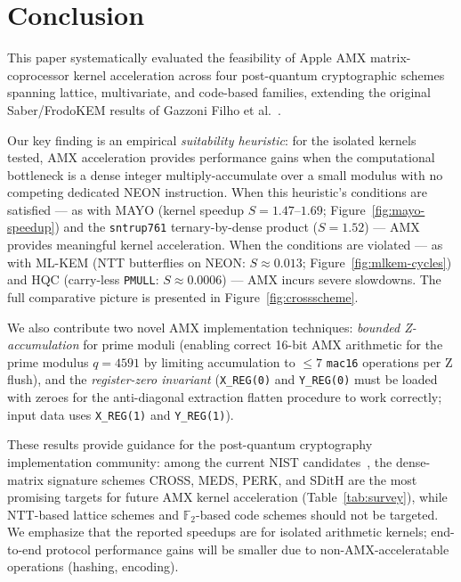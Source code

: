 \documentclass[utf8]{FrontiersinHarvard}
\begin{document}
\section{Conclusion}
\label{sec:conclusion}

This paper systematically evaluated the feasibility of Apple AMX matrix-coprocessor kernel acceleration across four post-quantum cryptographic schemes spanning lattice, multivariate, and code-based families, extending the original Saber/FrodoKEM results of Gazzoni Filho et al.~\cite{gazzoni2024pqcamx}.

Our key finding is an empirical \emph{suitability heuristic}: for the isolated kernels tested, AMX acceleration provides performance gains when the computational bottleneck is a dense integer multiply-accumulate over a small modulus with no competing dedicated NEON instruction. When this heuristic's conditions are satisfied --- as with MAYO (kernel speedup $S = 1.47$--$1.69$; Figure~\ref{fig:mayo-speedup}) and the \texttt{sntrup761} ternary-by-dense product ($S = 1.52$) --- AMX provides meaningful kernel acceleration. When the conditions are violated --- as with ML-KEM (NTT butterflies on NEON: $S \approx 0.013$; Figure~\ref{fig:mlkem-cycles}) and HQC (carry-less \texttt{PMULL}: $S \approx 0.0006$) --- AMX incurs severe slowdowns. The full comparative picture is presented in Figure~\ref{fig:crossscheme}.

We also contribute two novel AMX implementation techniques: \emph{bounded Z-accumulation} for prime moduli (enabling correct 16-bit AMX arithmetic for the prime modulus $q = 4591$ by limiting accumulation to $\leq 7$ \texttt{mac16} operations per Z flush), and the \emph{register-zero invariant} (\texttt{X\_REG(0)} and \texttt{Y\_REG(0)} must be loaded with zeroes for the anti-diagonal extraction flatten procedure to work correctly; input data uses \texttt{X\_REG(1)} and \texttt{Y\_REG(1)}).

These results provide guidance for the post-quantum cryptography implementation community: among the current NIST candidates~\cite{nist2026additional}, the dense-matrix signature schemes CROSS, MEDS, PERK, and SDitH are the most promising targets for future AMX kernel acceleration (Table~\ref{tab:survey}), while NTT-based lattice schemes and $\mathbb{F}_2$-based code schemes should not be targeted. We emphasize that the reported speedups are for isolated arithmetic kernels; end-to-end protocol performance gains will be smaller due to non-AMX-acceleratable operations (hashing, encoding).
\end{document}
